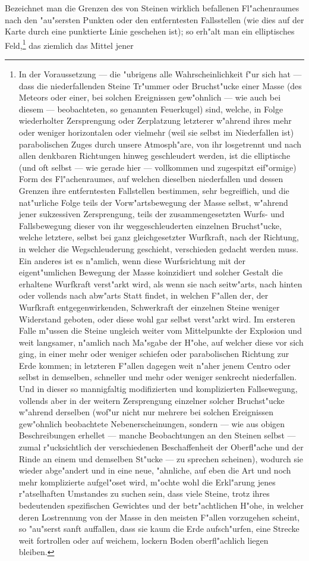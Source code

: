 \documentclass[a4paper, 11pt, oneside, german]{article}
\begin{document}
Bezeichnet man die Grenzen des von Steinen wirklich befallenen Fl"achenraumes nach den "au"sersten Punkten oder den entferntesten Fallsstellen (wie dies auf der Karte durch eine punktierte Linie geschehen ist); so erh"alt man ein elliptisches Feld,\footnote{In der Voraussetzung --- die "ubrigens alle Wahrscheinlichkeit f"ur sich hat --- dass die niederfallenden Steine Tr"ummer oder Bruchst"ucke einer Masse (des Meteors oder einer, bei solchen Ereignissen gew"ohnlich --- wie auch bei diesem --- beobachteten, so genannten Feuerkugel) sind, welche, in Folge wiederholter Zersprengung oder Zerplatzung letzterer w"ahrend ihres mehr oder weniger horizontalen oder vielmehr (weil sie selbst im Niederfallen ist) parabolischen Zuges durch unsere Atmosph"are, von ihr losgetrennt und nach allen denkbaren Richtungen hinweg geschleudert werden, ist die elliptische (und oft selbst --- wie gerade hier --- vollkommen und zugespitzt eif"ormige) Form des Fl"achenraumes, auf welchen dieselben niederfallen und dessen Grenzen ihre entferntesten Fallstellen bestimmen, sehr begreiflich, und die nat"urliche Folge teils der Vorw"artsbewegung der Masse selbst, w"ahrend jener sukzessiven Zersprengung, teils der zusammengesetzten Wurfs- und Fallsbewegung dieser von ihr weggeschleuderten einzelnen Bruchst"ucke, welche letztere, selbst bei ganz gleichgesetzter Wurfkraft, nach der Richtung, in welcher die Wegschleuderung geschieht, verschieden gedacht werden muss. Ein anderes ist es n"amlich, wenn diese Wurfsrichtung mit der eigent"umlichen Bewegung der Masse koinzidiert und solcher Gestalt die erhaltene Wurfkraft verst"arkt wird, als wenn sie nach seitw"arts, nach hinten oder vollends nach abw"arts Statt findet, in welchen F"allen der, der Wurfkraft entgegenwirkenden, Schwerkraft der einzelnen Steine weniger Widerstand geboten, oder diese wohl gar selbst verst"arkt wird. Im ersteren Falle m"ussen die Steine ungleich weiter vom Mittelpunkte der Explosion und weit langsamer, n"amlich nach Ma"sgabe der H"ohe, auf welcher diese vor sich ging, in einer mehr oder weniger schiefen oder parabolischen Richtung zur Erde kommen; in letzteren F"allen dagegen weit n"aher jenem Centro oder selbst in demselben, schneller und mehr oder weniger senkrecht niederfallen. Und in dieser so mannigfaltig modifizierten und komplizierten Fallsewegung, vollends aber in der weitern Zersprengung einzelner solcher Bruchst"ucke w"ahrend derselben (wof"ur nicht nur mehrere bei solchen Ereignissen gew"ohnlich beobachtete Nebenerscheinungen, sondern --- wie aus obigen Beschreibungen erhellet --- manche Beobachtungen an den Steinen selbst --- zumal r"ucksichtlich der verschiedenen Beschaffenheit der Oberfl"ache und der Rinde an einem und demselben St"ucke --- zu sprechen scheinen), wodurch sie wieder abge"andert und in eine neue, "ahnliche, auf eben die Art und noch mehr komplizierte aufgel"oset wird, m"ochte wohl die Erkl"arung jenes r"atselhaften Umstandes zu suchen sein, dass viele Steine, trotz ihres bedeutenden spezifischen Gewichtes und der betr"achtlichen H"ohe, in welcher deren Lostrennung von der Masse in den meisten F"allen vorzugehen scheint, so "au"serst sanft auffallen, dass sie kaum die Erde aufsch"urfen, eine Strecke weit fortrollen oder auf weichem, lockern Boden oberfl"achlich liegen bleiben.} das ziemlich das Mittel jener 
\end{document}
